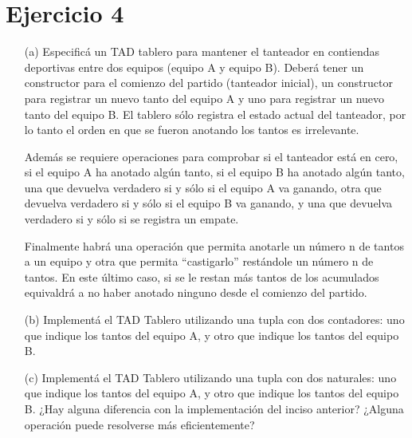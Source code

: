 \section{Ejercicio 4}
\begin{itemize}
    \item[(a)] Especificá un TAD tablero para mantener el tanteador en contiendas deportivas entre dos equipos (equipo A y equipo B). Deberá tener un constructor para el comienzo del partido (tanteador inicial), un constructor para registrar un nuevo tanto del equipo A y uno para registrar un nuevo tanto del equipo B. El tablero sólo registra el estado actual del tanteador, por lo tanto el orden en que se fueron anotando los tantos es irrelevante.

    Además se requiere operaciones para comprobar si el tanteador está en cero, si el equipo A ha anotado algún tanto, si el equipo B ha anotado algún tanto, una que devuelva verdadero si y sólo si el equipo A va ganando, otra que devuelva verdadero si y sólo si el equipo B va ganando, y una que devuelva verdadero si y sólo si se registra un empate.

    Finalmente habrá una operación que permita anotarle un número n de tantos a un equipo y otra que permita “castigarlo” restándole un número n de tantos. En este último caso, si se le restan más tantos de los acumulados equivaldrá a no haber anotado ninguno desde el comienzo del partido.    

    \item[(b)] Implementá el TAD Tablero utilizando una tupla con dos contadores: uno que indique los tantos del equipo A, y otro que indique los tantos del equipo B.
    \item[(c)] Implementá el TAD Tablero utilizando una tupla con dos naturales: uno que indique los tantos del equipo A, y otro que indique los tantos del equipo B. ¿Hay alguna diferencia con la implementación del inciso anterior? ¿Alguna operación puede resolverse más eficientemente?
\end{itemize}

